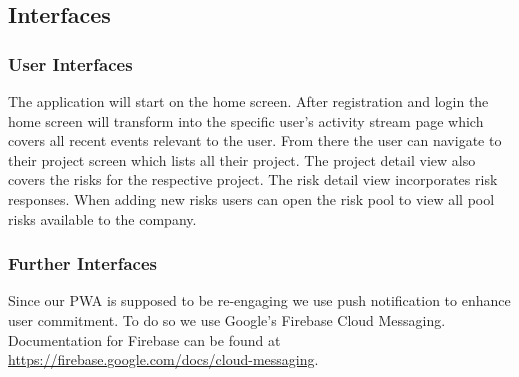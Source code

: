 \subsection{Interfaces}
\label{sec:domainBe}

\subsubsection{User Interfaces}
\label{sec:domainBea}
The application will start on the home screen. After registration and login the home screen will transform into the specific user's activity stream page which covers all recent events relevant to the user. From there the user can navigate to their project screen which lists all their project. The project detail view also covers the risks for the respective project. The risk detail view incorporates risk responses.
When adding new risks users can open the risk pool to view all pool risks available to the company.
\subsubsection{Further Interfaces}
\label{sec:domainBeb}
Since our  \acs{PWA} is supposed to be re-engaging we use push notification to enhance user commitment. To do so we use Google's Firebase Cloud Messaging. Documentation for Firebase can be found at \href{https://firebase.google.com/docs/cloud-messaging}{https://firebase.google.com/docs/cloud-messaging}.

